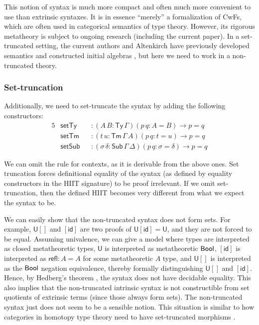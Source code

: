 \documentclass[dvipsnames]{lmcs} %
\newcommand{\U}{\mathsf{U}}
\newcommand{\ra}{\rightarrow}
\newcommand{\Ty}{\mathsf{Ty}}
\newcommand{\Tm}{\mathsf{Tm}}
\newcommand{\Sub}{\mathsf{Sub}}
\newcommand{\id}{\mathsf{id}}
\newcommand{\refl}{\mathsf{refl}}
\newcommand{\1}{\mathsf{1}} \renewcommand{\Pr}{\mathsf{Pr}}
\theoremstyle{plain}\newtheorem{satz}[thm]{Satz} %
\begin{document}
This notion of syntax is much more compact and often much more convenient to use
than extrinsic syntaxes. It is in essence ``merely'' a formalization of CwFs,
which are often used in categorical semantics of type theory. However, its
rigorous metatheory is subject to ongoing research (including the current
paper). In a set-truncated setting, the current authors and Altenkirch have
previously developed semantics and constructed initial algebras
\cite{kaposi2019constructing}, but here we need to work in a non-truncated
theory.

\subsubsection{Set-truncation}
Additionally, we need to set-truncate the syntax by adding the following constructors:
\begin{alignat*}{5}
  & \mathsf{setTy}  && : (A\,B : \Ty\,\Gamma)(p\,q : A = B)\ra p = q \\
  & \mathsf{setTm}  && : (t\,u : \Tm\,\Gamma\,A)(p\,q : t = u)\ra p = q \\
  & \mathsf{setSub} && : (\sigma\,\delta : \Sub\,\Gamma\,\Delta)(p\,q : \sigma = \delta)\ra p = q
\end{alignat*}

\noindent We can omit the rule for contexts, as it is derivable from the above ones. Set
truncation forces definitional equality of the syntax (as defined by equality
constructors in the HIIT signature) to be proof irrelevant. If we omit
set-truncation, then the defined HIIT becomes very different from what we expect
the syntax to be.

We can easily show that the non-truncated syntax does not form sets. For
example, $\U[]$ and $[\id]$ are two proofs of $\U[\id] = \U$, and they are not
forced to be equal. Assuming univalence, we can give a model where types are
interpreted as closed metatheoretic types, $\U$ is interpreted as metatheoretic
$\mathsf{Bool}$, $[\id]$ is interpreted as $\refl : A = A$ for some metatheoretic $A$
type, and $\U[]$ is interpreted as the $\mathsf{Bool}$ negation equivalence, thereby
formally distinguishing $\U[]$ and $[\id]$. Hence, by Hedberg's theorem
\cite{hedberg}, the syntax does not have decidable equality. This also implies
that the non-truncated intrinsic syntax is not constructible from set quotients
of extrinsic terms (since those always form sets). The non-truncated syntax just
does not seem to be a sensible notion. This situation is similar to how
categories in homotopy type theory need to have set-truncated morphisms
\cite{ahrens2015univalent}.
\end{document}
